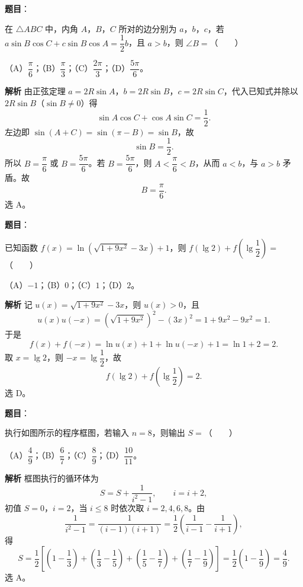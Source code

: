 \begin{answer}

\textbf{题目}：

在 $\triangle ABC$ 中，内角 $A$，$B$，$C$ 所对的边分别为 $a$，$b$，$c$，若 $a\sin B\cos C+c\sin B\cos A=\dfrac12b$，且 $a>b$，则 $\angle B=$\mbox{（　　）}

（A）$\dfrac\pi6$；（B）$\dfrac\pi3$；（C）$\dfrac{2\pi}3$；（D）$\dfrac{5\pi}6$。

\textbf{解析}
由正弦定理 $a=2R\sin A$，$b=2R\sin B$，$c=2R\sin C$，代入已知式并除以 $2R\sin B$（$\sin B\neq0$）得
\nopagebreak[4]
\[\sin A\cos C+\cos A\sin C=\frac12.\]
左边即 $\sin(A+C)=\sin(\pi-B)=\sin B$，故
\nopagebreak[4]
\[\sin B=\frac12.\]
所以 $B=\dfrac\pi6$ 或 $B=\dfrac{5\pi}6$。若 $B=\dfrac{5\pi}6$，则 $A<\dfrac\pi6<B$，从而 $a<b$，与 $a>b$ 矛盾。故
\nopagebreak[4]
\[B=\frac\pi6.\]
选 A。


\end{answer}
\begin{answer}

\textbf{题目}：

已知函数 $f(x)=\ln\left(\sqrt{1+9x^2}-3x\right)+1$，则 $f(\lg 2)+f\left(\lg\dfrac12\right)=$\mbox{（　　）}

（A）$-1$；（B）$0$；（C）$1$；（D）$2$。

\textbf{解析}
记 $u(x)=\sqrt{1+9x^2}-3x$，则 $u(x)>0$，且
\nopagebreak[4]
\[u(x)u(-x)=\left(\sqrt{1+9x^2}\right)^2-(3x)^2=1+9x^2-9x^2=1.\]
于是
\nopagebreak[4]
\[f(x)+f(-x)=\ln u(x)+1+\ln u(-x)+1=\ln 1+2=2.\]
取 $x=\lg2$，则 $-x=\lg\dfrac12$，故
\nopagebreak[4]
\[f(\lg2)+f\left(\lg\frac12\right)=2.\]
选 D。


\end{answer}
\begin{answer}

\textbf{题目}：

执行如图所示的程序框图，若输入 $n=8$，则输出 $S=$\mbox{（　　）}
\nopagebreak[4]
\begin{center}\end{center}
\nopagebreak[4]
（A）$\dfrac49$；（B）$\dfrac67$；（C）$\dfrac89$；（D）$\dfrac{10}{11}$。

\textbf{解析}
框图执行的循环体为
\nopagebreak[4]
\[S=S+\frac1{i^2-1},\qquad i=i+2,\]
初值 $S=0$，$i=2$，当 $i\leqslant8$ 时依次取 $i=2,4,6,8$。由
\nopagebreak[4]
\[\frac1{i^2-1}=\frac1{(i-1)(i+1)}=\frac12\left(\frac1{i-1}-\frac1{i+1}\right),\]
得
\nopagebreak[4]
\[S=\frac12\left[\left(1-\frac13\right)+\left(\frac13-\frac15\right)+\left(\frac15-\frac17\right)+\left(\frac17-\frac19\right)\right]
=\frac12\left(1-\frac19\right)=\frac49.\]
选 A。


\end{answer}
